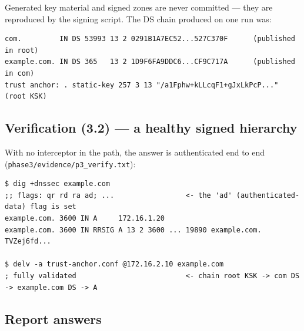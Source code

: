 \documentclass[11pt,a4paper]{article}
\begin{document}
Generated key material and signed zones are never committed --- they are reproduced by the signing
script. The DS chain produced on one run was:
\begin{lstlisting}
com.         IN DS 53993 13 2 0291B1A7EC52...527C370F      (published in root)
example.com. IN DS 365   13 2 1D9F6FA9DDC6...CF9C717A      (published in com)
trust anchor: . static-key 257 3 13 "/a1Fphw+kLLcqF1+gJxLkPcP..."   (root KSK)
\end{lstlisting}

\subsection{Verification (3.2) --- a healthy signed hierarchy}
With no interceptor in the path, the answer is authenticated end to end
(\texttt{phase3/evidence/p3\_verify.txt}):
\begin{lstlisting}
$ dig +dnssec example.com
;; flags: qr rd ra ad; ...                 <- the 'ad' (authenticated-data) flag is set
example.com. 3600 IN A     172.16.1.20
example.com. 3600 IN RRSIG A 13 2 3600 ... 19890 example.com. TVZej6fd...

$ delv -a trust-anchor.conf @172.16.2.10 example.com
; fully validated                          <- chain root KSK -> com DS -> example.com DS -> A
\end{lstlisting}

\subsection{Report answers}
\end{document}
